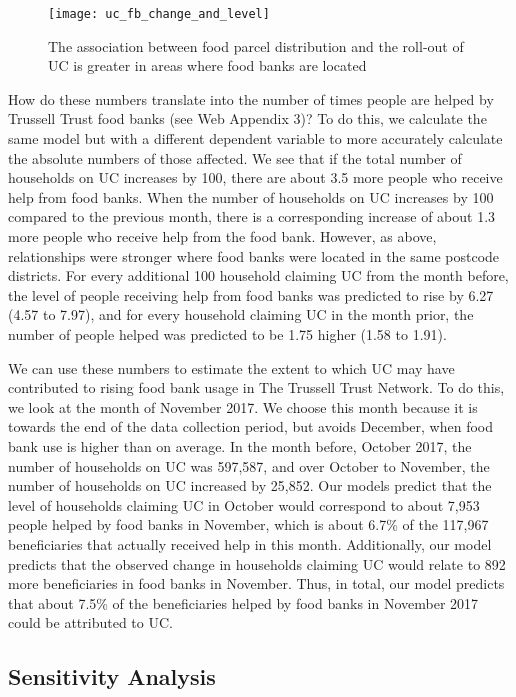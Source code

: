 \documentclass[12pt,article,oneside]{memoir}
\begin{document}
\begin{figure}
\caption{The association between food parcel distribution and the roll-out of UC is greater in areas where food banks are located}
\begin{center}
\texttt{[image: uc\_fb\_change\_and\_level]}
\end{center}

\end{figure}

How do these numbers translate into the number of times people are helped by Trussell Trust  food banks (see Web Appendix 3)? To do this, we calculate the same model but with a different dependent variable to more accurately calculate the absolute numbers of those affected. We see that if the total number of households on UC increases by 100, there are about 3.5 more people who receive help from food banks. When the number of households on UC increases by 100 compared to the previous month, there is a corresponding increase of about 1.3 more people who receive help from the food bank. However, as above, relationships were stronger where food banks were located in the same postcode districts. For every additional 100 household claiming UC from the month before, the level of people receiving help from food banks was predicted to rise by 6.27 (4.57 to 7.97), and for every household claiming UC in the month prior, the number of people helped was predicted to be 1.75 higher (1.58 to 1.91).

We can use these numbers to estimate the extent to which UC may have contributed to rising food bank usage in The Trussell Trust Network. To do this, we look at the month of November 2017. We choose this month because it is towards the end of the data collection period, but avoids December, when food bank use is higher than on average. In the month before, October 2017, the number of households on UC was 597,587, and over October to November, the number of households on UC increased by 25,852. Our models predict that the level of households claiming UC in October would correspond to about 7,953 people helped by food banks in November, which is about 6.7\% of the 117,967 beneficiaries that actually received help in this month. Additionally, our model predicts that the observed change in households claiming UC would relate to 892 more beneficiaries in food banks in November. Thus, in total, our model predicts that about 7.5\% of the beneficiaries helped by food banks in November 2017 could be attributed to UC.

\subsection*{Sensitivity Analysis}
\end{document}
